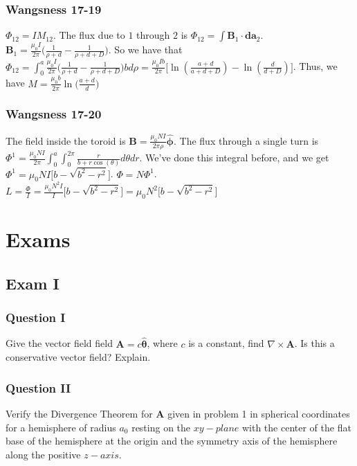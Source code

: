 \documentclass[oneside]{book}
\theoremstyle{definition}
\newcommand*\B[1]{\mathbf{#1}}
\newcommand*\Bh[1]{\mathbf{\hat{#1}}}
\begin{document}
\subsubsection{Wangsness 17-19}

$\Phi_{12} = IM_{12}$. The flux due to $1$ through $2$ is $\Phi_{12} = \int \B{B}_1 \cdot \B{da}_2$. $\B{B}_1 = \frac{\mu_0 I}{2\pi} \big( \frac{1}{\rho+d}- \frac{1}{\rho+d+D}\big)$. So we have that $\Phi_{12} = \int_{0}^{a} \frac{\mu_0 I}{2\pi} \big(\frac{1}{\rho+d}- \frac{1}{\rho+d+D}\big) bd\rho = \frac{\mu_0 Ib}{2\pi}\big[ \ln(\frac{a+d}{a+d+D}) - \ln(\frac{d}{d+D})\big]$. Thus, we have $M = \frac{\mu_0 b}{2\pi} \ln\big(\frac{a+d}{d}\big)$

\subsubsection{Wangsness 17-20}

The field inside the toroid is $\B{B} = \frac{\mu_0 NI}{2\pi \rho} \Bh{\phi}$. The flux through a single turn is $\Phi^1 = \frac{\mu_0 NI}{2\pi} \int_{0}^{a} \int_{0}^{2\pi} \frac{r}{b+r\cos(\theta)}d\theta dr$. We've done this integral before, and we get $\Phi^1= \mu_0 NI\big[b-\sqrt{b^2-r^2}\big]$. $\Phi = N\Phi^1$. $L = \frac{\Phi}{I} = \frac{\mu_0 N^2 I}{I} \big[b-\sqrt{b^2-r^2}\big] = \mu_0 N^2 \big[b-\sqrt{b^2-r^2}\big]$

\section{Exams}

\subsection*{Exam I}

\subsubsection{Question I}

Give the vector field field $\B{A} = c\Bh{\theta}$, where $c$ is a constant, find $\nabla \times \B{A}$. Is this a conservative vector field? Explain.

\subsubsection{Question II}

Verify the Divergence Theorem for $\B{A}$ given in problem 1 in spherical coordinates for a hemisphere of radius $a_0$ resting on the $xy-plane$ with the center of the flat base of the hemisphere at the origin and the symmetry axis of the hemisphere along the positive $z-axis$.
\end{document}
